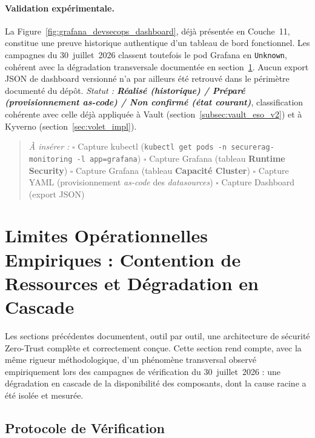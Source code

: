 \paragraph{Validation expérimentale.}
La Figure~\ref{fig:grafana_devsecops_dashboard}, déjà présentée en Couche~11, constitue une preuve historique authentique d'un tableau de bord fonctionnel. Les campagnes du 30~juillet~2026 classent toutefois le pod Grafana en \texttt{Unknown}, cohérent avec la dégradation transversale documentée en section~\ref{sec:limites_operationnelles_empiriques}. Aucun export JSON de dashboard versionné n'a par ailleurs été retrouvé dans le périmètre documenté du dépôt. \textit{Statut : \textbf{Réalisé (historique) / Préparé (provisionnement as-code) / Non confirmé (état courant)}}, classification cohérente avec celle déjà appliquée à Vault (section~\ref{subsec:vault_eso_v2}) et à Kyverno (section~\ref{sec:volet_impl}).

\begin{quote}
\scriptsize
\textit{À insérer :} \quad
$\square$ Capture kubectl (\texttt{kubectl get pods -n securerag-monitoring -l app=grafana}) \quad
$\square$ Capture Grafana (tableau \textbf{Runtime Security}) \quad
$\square$ Capture Grafana (tableau \textbf{Capacité Cluster}) \quad
$\square$ Capture YAML (provisionnement \textit{as-code} des \textit{datasources}) \quad
$\square$ Capture Dashboard (export JSON)
\end{quote}

\section{Limites Opérationnelles Empiriques : Contention de Ressources et Dégradation en Cascade}
\label{sec:limites_operationnelles_empiriques}

Les sections précédentes documentent, outil par outil, une architecture de sécurité Zero-Trust complète et correctement conçue. Cette section rend compte, avec la même rigueur méthodologique, d'un phénomène transversal observé empiriquement lors des campagnes de vérification du 30~juillet~2026 : une dégradation en cascade de la disponibilité des composants, dont la cause racine a été isolée et mesurée.

\subsection{Protocole de Vérification}

